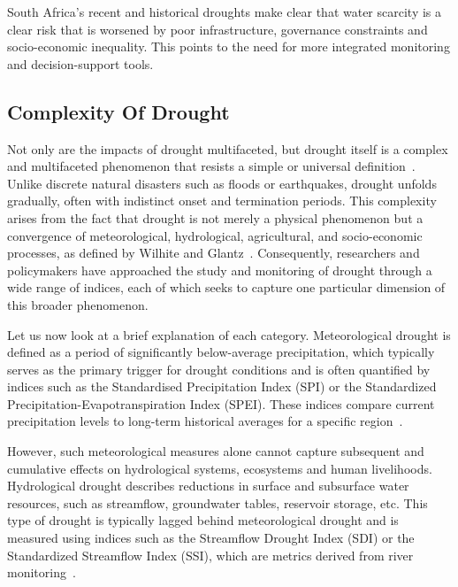 South Africa’s recent and historical droughts make clear that water scarcity is a clear risk that is worsened by poor infrastructure, governance constraints and socio-economic inequality. This points to the need for more integrated monitoring and decision-support tools.

\subsection{Complexity Of Drought}
Not only are the impacts of drought multifaceted, but drought itself is a complex and multifaceted phenomenon that resists a simple or universal definition~\cite{Llyod+Benjamin}. Unlike discrete natural disasters such as floods or earthquakes, drought unfolds gradually, often with indistinct onset and termination periods. This complexity arises from the fact that drought is not merely a physical phenomenon but a convergence of meteorological, hydrological, agricultural, and socio-economic processes, as defined by Wilhite and Glantz~\cite{Wilhite+Glantz}. Consequently, researchers and policymakers have approached the study and monitoring of drought through a wide range of indices, each of which seeks to capture one particular dimension of this broader phenomenon.

Let us now look at a brief explanation of each category. Meteorological drought is defined as a period of significantly below-average precipitation, which typically serves as the primary trigger for drought conditions and is often quantified by indices such as the Standardised Precipitation Index (SPI) or the Standardized Precipitation-Evapotranspiration Index (SPEI). These indices compare current precipitation levels to long-term historical averages for a specific region~\cite{spi_seminal_paper, douville2021water, spei_seminal_paper, wmo_indice_guide}. 

However, such meteorological measures alone cannot capture subsequent and cumulative effects on hydrological systems, ecosystems and human livelihoods. Hydrological drought describes reductions in surface and subsurface water resources, such as streamflow, groundwater tables, reservoir storage, etc. This type of drought is typically lagged behind meteorological drought and is measured using indices such as the Streamflow Drought Index (SDI) or the Standardized Streamflow Index (SSI), which are metrics derived from river monitoring~\cite{sdi_seminal_paper, Loon+Anne, wmo_indice_guide,ssi_seminal_paper}. 

